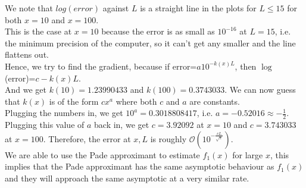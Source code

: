 \documentclass[10pt]{article}
\begin{document}
\noindent We note that $log(error)$ against $L$ is a straight line in the plots for $L\leq15$ for both $x=10$ and $x=100$.\\
This is the case at $x=10$ because the error is as small as $10^{-16}$ at $L=15$, i.e. the minimum precision of the computer, so it can't get any smaller and the line flattens out.\\
Hence, we try to find the gradient, because if error=$a10^{-k(x)L}$, then $\log$(error)=$c-k(x)L$.\\
And we get $k(10)=1.23990433$ and $k(100)=0.3743033$. We can now guess that $k(x)$ is of the form $cx^a$ where both $c$ and $a$ are constants.\\
Plugging the numbers in, we get $10^a=0.3018808417$, i.e. \underline{$a=-0.52016\approx-\frac{1}{2}$}.\\
Plugging this value of $a$ back in, we get $c=3.92092$ at $x=10$ and $c=3.743033$ at $x=100$. Therefore, the error at $x,L$ is roughly \underline{$\mathcal{O}(10^{-\frac{cL}{\sqrt{x}}})$}.\\
We are able to use the Pade approximant to estimate $f_1(x)$ for large $x$, this implies that the Pade approximant has the same asymptotic behaviour as $f_1(x)$ and they will approach the same asymptotic at a very similar rate.
\end{document}
